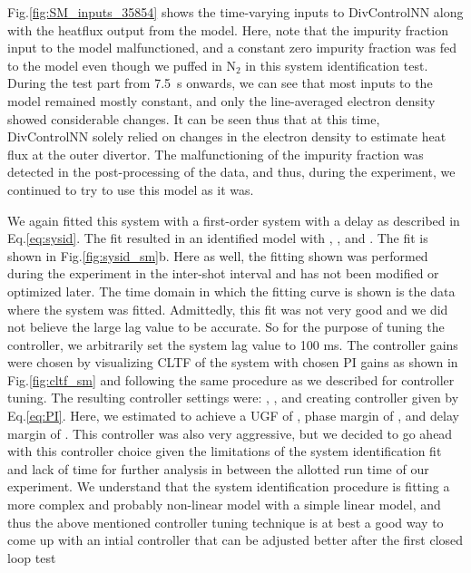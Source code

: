 Fig.\ref{fig:SM_inputs_35854} shows the time-varying inputs to DivControlNN along with the heatflux output from the model.
Here, note that the impurity fraction input to the model malfunctioned, and a constant zero impurity fraction was fed to the model even though we puffed in N$_2$ in this system identification test. During the test part from 7.5~s onwards, we can see that most inputs to the model remained mostly constant, and only the line-averaged electron density showed considerable changes.
It can be seen thus that at this time, DivControlNN solely relied on changes in the electron density to estimate heat flux at the outer divertor.
The malfunctioning of the impurity fraction was detected in the post-processing of the data, and thus, during the experiment, we continued to try to use this model as it was.

We again fitted this system with a first-order system with a delay as described in Eq.\ref{eq:sysid}.
The fit resulted in an identified model with \SMK, \SMTau, and \SML.
The fit is shown in Fig.\ref{fig:sysid_sm}b.
Here as well, the fitting shown was performed during the experiment in the inter-shot interval and has not been modified or optimized later.
The time domain in which the fitting curve is shown is the data where the system was fitted.
Admittedly, this fit was not very good and we did not believe the large lag value to be accurate.
So for the purpose of tuning the controller, we arbitrarily set the system lag value to 100 ms.
The controller gains were chosen by visualizing \ac{CLTF} of the system with chosen PI gains as shown in Fig.\ref{fig:cltf_sm} and following the same procedure as we described for \Afrac controller tuning.
The resulting controller settings were: \SMKp, \SMTi, and \SMstau{} creating controller given by Eq.\ref{eq:PI}.
Here, we estimated to achieve a \ac{UGF} of \SMUGF, phase margin of \SMPhaseMargin, and delay margin of \SMDelayMargin.
This controller was also very aggressive, but we decided to go ahead with this controller choice given the limitations of the system identification fit and lack of time for further analysis in between the allotted run time of our experiment.
We understand that the system identification procedure is fitting a more complex and probably non-linear model with a simple linear model, and thus the above mentioned controller tuning technique is at best a good way to come up with an intial controller that can be adjusted better after the first closed loop test
